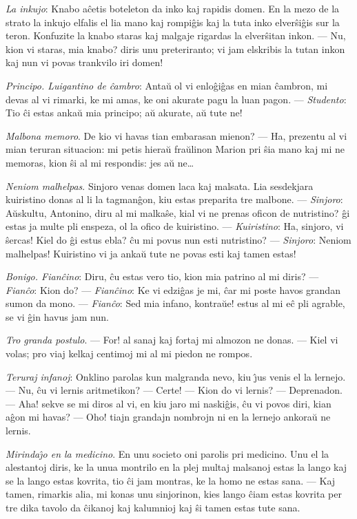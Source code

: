 \emph{La inkujo}: Knabo a\^cetis boteleton da inko kaj rapidis
domen. En la mezo de la strato la inkujo elfalis el lia mano kaj
rompi\^gis kaj la tuta inko elver\^si\^gis sur la teron. Konfuzite
la knabo staras kaj malgaje rigardas la elver\^sitan inkon. --- Nu,
kion vi staras, mia knabo? diris unu preteriranto; vi jam elskribis
la tutan inkon kaj nun vi povas trankvilo iri domen!

\emph{Principo. Luigantino de \^cambro}: Anta\u u ol vi
enlo\^gi\^gas en mian \^cambron, mi devas al vi rimarki, ke mi amas,
ke oni akurate pagu la luan pagon. --- {\sl Studento}: Tio \^ci
estas anka\u u mia principo; a\u u akurate, a\u u tute ne!

\emph{Malbona memoro}. De kio vi havas tian embarasan mienon? ---
Ha, prezentu al vi mian teruran situacion: mi petis hiera\u u fra\u
ulinon Marion pri \^sia mano kaj mi ne memoras, kion \^si al mi
respondis: jes a\u u ne\dots

\emph{Neniom malhelpas}. Sinjoro venas domen laca kaj malsata. Lia
sesdekjara kuiristino donas al li la tagman\^gon, kiu estas
preparita tre malbone. --- {\sl Sinjoro}: A\u uskultu, Antonino,
diru al mi malka\^se, kial vi ne prenas oficon de nutristino? \^gi
estas ja multe pli enspeza, ol la ofico de kuiristino. --- {\sl
Kuiristino}: Ha, sinjoro, vi \^sercas! Kiel do \^gi estus ebla? \^cu
mi povus nun esti nutristino? --- {\sl Sinjoro}: Neniom malhelpas!
Kuiristino vi ja anka\u u tute ne povas esti kaj tamen estas!

\emph{Bonigo. Fian\^cino}: Diru, \^cu estas vero tio, kion mia
patrino al mi diris? --- {\sl Fian\^co}: Kion do? --- {\sl
Fian\^cino}: Ke vi edzi\^gas je mi, \^car mi poste havos grandan
sumon da mono. --- {\sl Fian\^co}: Sed mia infano, kontra\u ue!
estus al mi e\^c pli agrable, se vi \^gin havus jam nun.

\emph{Tro granda postulo}. --- For! al sanaj kaj fortaj mi almozon
ne donas. --- Kiel vi volas; pro viaj kelkaj centimoj mi al mi
piedon ne rompos.

\emph{Teruraj infanoj}: Onklino parolas kun malgranda nevo, kiu
\^{\j}us venis el la lernejo. --- Nu, \^cu vi lernis aritmetikon?
--- Certe! --- Kion do vi lernis? --- Deprenadon. --- Aha! sekve se mi
diros al vi, en kiu jaro mi naski\^gis, \^cu vi povos diri, kian
a\^gon mi havas? --- Oho! tiajn grandajn nombrojn ni en la lernejo
ankora\u u ne lernis.

\emph{Mirinda\^{\j}o en la medicino}. En unu societo oni parolis pri
medicino. Unu el la alestantoj diris, ke la unua montrilo en la plej
multaj malsanoj estas la lango kaj se la lango estas kovrita, tio
\^ci jam montras, ke la homo ne estas sana. --- Kaj tamen, rimarkis
alia, mi konas unu sinjorinon, kies lango \^ciam estas kovrita per
tre dika tavolo da \^cikanoj kaj kalumnioj kaj \^si tamen estas tute
sana.

